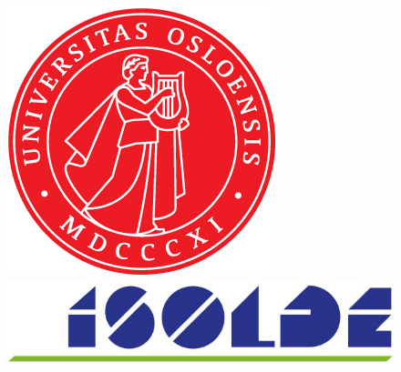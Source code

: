 \documentclass[twoside,english]{uiofysmaster/uiofysmaster}
\begin{document}
\begin{acknowledgements}
\begin{figure}[h]
	\begin{minipage}[b]{0.25\linewidth}
	\centering
		\includegraphics[width=\textwidth]{uiofysmaster/figures/apollonseglet/Apollonseglet/UiO_Segl_150dpi.png}
	\end{minipage}
	\hspace{4.8cm}
	\begin{minipage}[b]{0.45\linewidth}
	\centering
		\includegraphics[width=\textwidth]{Images/ISOLDE-logo.png}
	\end{minipage}
\end{figure}


\end{acknowledgements}


\tableofcontents


\end{document}
